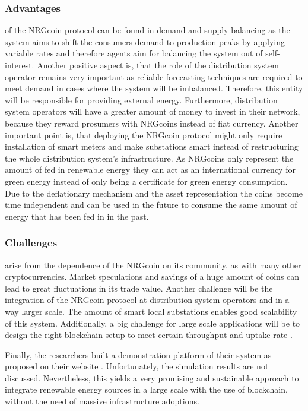 \documentclass[runningheads]{llncs}
\begin{document}
\subsubsection{Advantages} of the NRGcoin protocol can be found in demand and supply balancing as the system aims to shift the consumers demand to production peaks by applying variable rates and therefore agents aim for balancing the system out of self-interest. \newline
Another positive aspect is, that the role of the distribution system operator remains very important as reliable forecasting techniques are required to meet demand in cases where the system will be imbalanced. Therefore, this entity will be responsible for providing external energy. Furthermore, distribution system operators will have a greater amount of money to invest in their network, because they reward prosumers with NRGcoins instead of fiat currency. Another important point is, that deploying the NRGcoin protocol might only require installation of smart meters and make substations smart instead of restructuring the whole distribution system’s infrastructure. \newline
As NRGcoins only represent the amount of fed in renewable energy they can act as an international currency for green energy instead of only being a certificate for green energy consumption. Due to the deflationary mechanism and the asset representation the coins become time independent and can be used in the future to consume the same amount of energy that has been fed in in the past. \cite{mihaylov_nrgcoin}

\subsubsection{Challenges} arise from the dependence of the NRGcoin on its community, as with many other cryptocurrencies. Market speculations and savings of a huge amount of coins can lead to great fluctuations in its trade value. Another challenge will be the integration of the NRGcoin protocol at distribution system operators and in a way larger scale. The amount of smart local substations enables good scalability of this system. \cite{mihaylov_nrgcoin} \newline
Additionally, a big challenge for large scale applications will be to design the right blockchain setup to meet certain throughput and uptake rate \cite{mihaylov_nrgcoin2}.


Finally, the researchers \cite{mihaylov_nrgcoin} built a demonstration platform of their system as proposed on their website \cite{nrgcoin_demo}. Unfortunately, the simulation results are not discussed. Nevertheless, this yields a very promising and sustainable approach to integrate renewable energy sources in a large scale with the use of blockchain, without the need of massive infrastructure adoptions.
\end{document}
